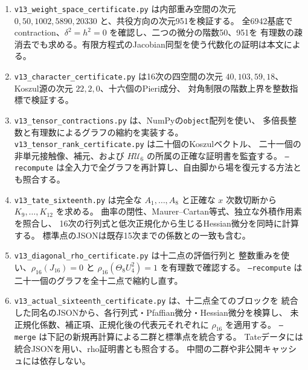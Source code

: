 \begin{enumerate}
 \item \texttt{v13\_weight\_space\_certificate.py} は内部重み空間の次元
 $0,50,1002,5890,20330$ と、共役方向の次元951を検証する。
 全6942基底でcontraction、$\delta^2=h^2=0$ を確認し、二つの微分の階数50、951を
 有理数の疎消去でも求める。有限方程式のJacobian同型を使う代数化の証明は本文による。
 \item \texttt{v13\_character\_certificate.py} は16次の四空間の次元
 $40,103,59,18$、Koszul源の次元 $22,2,0$、十六個のPieri成分、
 対角制限の階数上界を整数指標で検証する。
 \item \texttt{v13\_tensor\_contractions.py} は、NumPyの\texttt{object}配列を使い、
 多倍長整数と有理数によるグラフの縮約を実装する。
 \texttt{v13\_tensor\_rank\_certificate.py} は二十個のKoszulベクトル、
 二十一個の非単元接触像、補元、および $H\mathcal U_6$ の所属の正確な証明書を監査する。
 \texttt{--recompute} は全入力で全グラフを再計算し、自由脚から場を復元する方法とも照合する。
 \item \texttt{v13\_tate\_sixteenth.py} は完全な $A_1,\ldots,A_8$ と正確な
 $x$ 次数切断から $K_9,\ldots,K_{12}$ を求める。
 曲率の閉性、Maurer--Cartan等式、独立な外積作用素を照合し、
 16次の行列式と低次正規化から生じるHessian微分を同時に計算する。
 標準点のJSONは既存15次までの係数との一致も含む。
 \item \texttt{v13\_diagonal\_rho\_certificate.py} は十二点の評価行列と
 整数重みを使い、$\rho_{16}(J_{16})=0$ と
 $\rho_{16}(\Theta_8U_4^2)=1$ を有理数で確認する。
 \texttt{--recompute} は二十一個のグラフを全十二点で縮約し直す。
 \item \texttt{v13\_actual\_sixteenth\_certificate.py} は、十二点全てのブロックを
 統合した同名のJSONから、各行列式・Pfaffian微分・Hessian微分を検算し、
 未正規化係数、補正項、正規化後の代表元それぞれに $\rho_{16}$ を適用する。
 \texttt{--merge} は下記の新規再計算による二群と標準点を統合する。
 Tateデータには統合JSONを用い、rho証明書とも照合する。
 中間の二群や非公開キャッシュには依存しない。

\end{enumerate}

